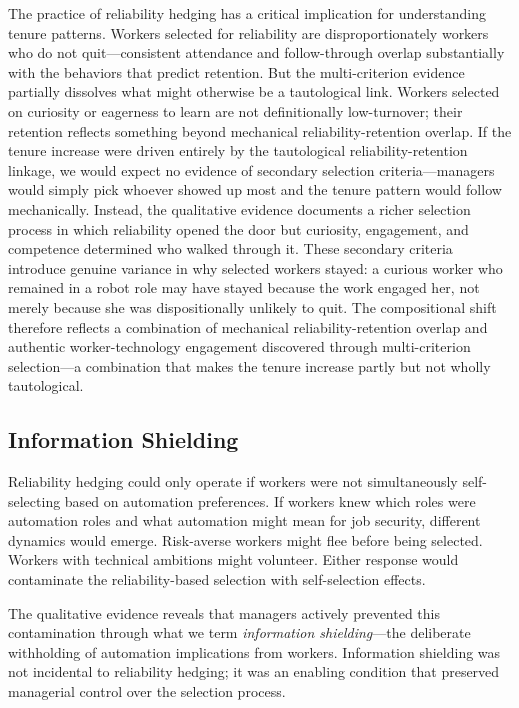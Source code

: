 \documentclass[12pt]{article}
\begin{document}
The practice of reliability hedging has a critical implication for understanding tenure patterns. Workers selected for reliability are disproportionately workers who do not quit---consistent attendance and follow-through overlap substantially with the behaviors that predict retention. But the multi-criterion evidence partially dissolves what might otherwise be a tautological link. Workers selected on curiosity or eagerness to learn are not definitionally low-turnover; their retention reflects something beyond mechanical reliability-retention overlap. If the tenure increase were driven entirely by the tautological reliability-retention linkage, we would expect no evidence of secondary selection criteria---managers would simply pick whoever showed up most and the tenure pattern would follow mechanically. Instead, the qualitative evidence documents a richer selection process in which reliability opened the door but curiosity, engagement, and competence determined who walked through it. These secondary criteria introduce genuine variance in why selected workers stayed: a curious worker who remained in a robot role may have stayed because the work engaged her, not merely because she was dispositionally unlikely to quit. The compositional shift therefore reflects a combination of mechanical reliability-retention overlap and authentic worker-technology engagement discovered through multi-criterion selection---a combination that makes the tenure increase partly but not wholly tautological.

\subsection{Information Shielding}

Reliability hedging could only operate if workers were not simultaneously self-selecting based on automation preferences. If workers knew which roles were automation roles and what automation might mean for job security, different dynamics would emerge. Risk-averse workers might flee before being selected. Workers with technical ambitions might volunteer. Either response would contaminate the reliability-based selection with self-selection effects.

The qualitative evidence reveals that managers actively prevented this contamination through what we term \textit{information shielding}---the deliberate withholding of automation implications from workers. Information shielding was not incidental to reliability hedging; it was an enabling condition that preserved managerial control over the selection process.
\end{document}
